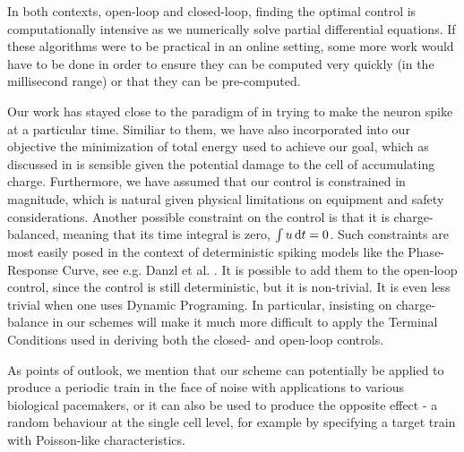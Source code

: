 \documentclass[12pt]{iopart}
\begin{document}
In both contexts, open-loop and closed-loop, finding the optimal control is
computationally intensive as we numerically solve partial differential
equations. If these algorithms were to be practical in an online setting, some
more work would have to be done in order to ensure they can be computed very
quickly (in the millisecond range) or that they can be pre-computed.

Our work has stayed close to the paradigm of \cite{Ahmadian2011} in
trying to make the neuron spike at a particular time. 
Similiar to them, we have also incorporated into our objective
the minimization of total energy used to achieve our goal, which as discussed in
\cite{Ahmadian2011} is sensible given the potential damage to the cell of
accumulating charge. Furthermore, we have assumed that our control is
constrained in magnitude, which is natural given physical limitations on
equipment and safety considerations. Another possible constraint on the control
is that it is charge-balanced, meaning that its time integral is zero, $\int u
\, \mathrm{d} t = 0$. Such constraints are most easily posed in the context of
deterministic spiking models like the Phase-Response Curve, see e.g. Danzl et
al. \cite{Danzl2010}. It is possible to add them to the open-loop control, since
the control is still deterministic, but it is non-trivial. It is even less
trivial when one uses Dynamic Programing. In
particular, insisting on charge-balance in our schemes will make it much more
difficult to apply the Terminal Conditions used in deriving both the closed- and
open-loop controls.


As points of outlook, we mention that our scheme can potentially be applied to
produce a periodic train in the face of noise with applications to various
biological pacemakers, or it can also be used to produce the opposite effect - a
random behaviour at the single cell level, for example by specifying a target
train with Poisson-like characteristics.
\end{document}
